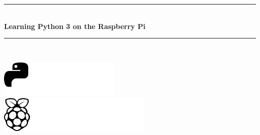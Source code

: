 \makeatletter
\pagecolor{TitleColor}\afterpage{\nopagecolor}
{\color{white}
\begin{titlepage}
 \begin{center}
  {\fontsize{53}{63}\selectfont \textbf{\thetitle}\par}
  \rule{\linewidth}{1.5mm}
  \\[0.4cm]
  {\fontsize{24}{44}\selectfont \color{black} \textbf{Learning Python 3 on the Raspberry Pi}}
\end{center}
\vfill
\hfill
\begin{minipage}{0.62\textwidth}
\begin{flushright}
  {\LARGE \textbf{\theauthor}}
  \rule{\linewidth}{1.0mm}
  \\[0.4cm]
  {\LARGE \color{black} \textbf{\textit{\py@release}}}
 \end{flushright}
 \end{minipage}
\vfill
\includegraphics[height=1.75cm,keepaspectratio]{python-logo-bw.pdf}\hfill
\includegraphics[height=1.75cm,keepaspectratio]{raspberry-pi-logo-bw.pdf}
\end{titlepage}
}
\makeatother
